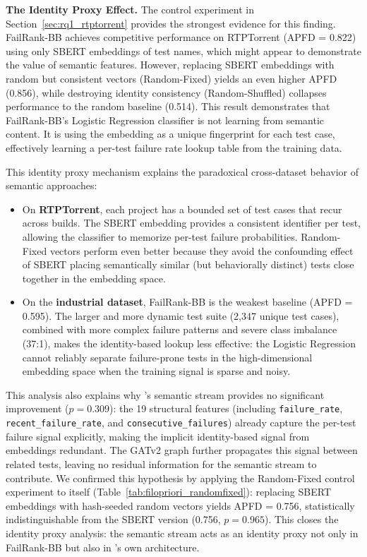 \textbf{The Identity Proxy Effect.}
The control experiment in Section~\ref{sec:rq1_rtptorrent} provides
the strongest evidence for this finding. FailRank-BB achieves competitive
performance on RTPTorrent (APFD = 0.822) using only SBERT embeddings of
test names, which might appear to demonstrate the value of semantic
features. However, replacing SBERT embeddings with random but
consistent vectors (Random-Fixed) yields an even higher APFD (0.856),
while destroying identity consistency (Random-Shuffled) collapses
performance to the random baseline (0.514). This result demonstrates that
FailRank-BB's Logistic Regression classifier is not learning from semantic
content. It is using the embedding as a unique fingerprint for each
test case, effectively learning a per-test failure rate lookup table from
the training data.

This identity proxy mechanism explains the paradoxical cross-dataset
behavior of semantic approaches:
\begin{itemize}
    \item On \textbf{RTPTorrent}, each project has a bounded set of test
    cases that recur across builds. The SBERT embedding provides a
    consistent identifier per test, allowing the classifier to memorize
    per-test failure probabilities. Random-Fixed vectors perform even
    better because they avoid the confounding effect of SBERT placing
    semantically similar (but behaviorally distinct) tests close together
    in the embedding space.
    \item On the \textbf{industrial dataset}, FailRank-BB is the weakest
    baseline (APFD = 0.595). The larger and more dynamic test suite
    (2,347 unique test cases), combined with more complex failure patterns
    and severe class imbalance (37:1), makes the identity-based lookup
    less effective: the Logistic Regression cannot reliably separate
    failure-prone tests in the high-dimensional embedding space when the
    training signal is sparse and noisy.
\end{itemize}

This analysis also explains why \filopriori{}'s semantic stream provides
no significant improvement ($p = 0.309$): the 19 structural features
(including \texttt{failure\_rate}, \texttt{recent\_failure\_rate}, and
\texttt{consecutive\_failures}) already capture the per-test failure
signal explicitly, making the implicit identity-based signal
from embeddings redundant. The GATv2 graph further propagates this
signal between related tests, leaving no residual information for the
semantic stream to contribute. We confirmed this hypothesis by applying
the Random-Fixed control experiment to \filopriori{} itself
(Table~\ref{tab:filopriori_randomfixed}): replacing SBERT embeddings
with hash-seeded random vectors yields APFD = 0.756, statistically
indistinguishable from the SBERT version (0.756, $p = 0.965$). This
closes the identity proxy analysis: the semantic stream acts as an
identity proxy not only in FailRank-BB but also in \filopriori{}'s
own architecture.


